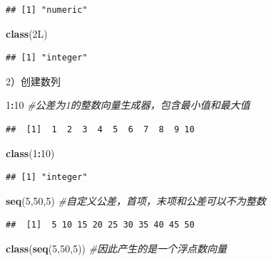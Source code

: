 \documentclass[]{book}
\newenvironment{Shaded}{\begin{snugshade}}{\end{snugshade}}
\newcommand{\CommentTok}[1]{\textcolor[rgb]{0.56,0.35,0.01}{\textit{#1}}}
\newcommand{\DecValTok}[1]{\textcolor[rgb]{0.00,0.00,0.81}{#1}}
\newcommand{\KeywordTok}[1]{\textcolor[rgb]{0.13,0.29,0.53}{\textbf{#1}}}
\newcommand{\NormalTok}[1]{#1}
\newcommand{\OperatorTok}[1]{\textcolor[rgb]{0.81,0.36,0.00}{\textbf{#1}}}
\begin{document}
\begin{verbatim}
## [1] "numeric"
\end{verbatim}

\begin{Shaded}
\begin{Highlighting}[]
\KeywordTok{class}\NormalTok{(2L)}
\end{Highlighting}
\end{Shaded}

\begin{verbatim}
## [1] "integer"
\end{verbatim}

2）创建数列

\begin{Shaded}
\begin{Highlighting}[]
\DecValTok{1}\OperatorTok{:}\DecValTok{10} \CommentTok{#公差为1的整数向量生成器，包含最小值和最大值}
\end{Highlighting}
\end{Shaded}

\begin{verbatim}
##  [1]  1  2  3  4  5  6  7  8  9 10
\end{verbatim}

\begin{Shaded}
\begin{Highlighting}[]
\KeywordTok{class}\NormalTok{(}\DecValTok{1}\OperatorTok{:}\DecValTok{10}\NormalTok{)}
\end{Highlighting}
\end{Shaded}

\begin{verbatim}
## [1] "integer"
\end{verbatim}

\begin{Shaded}
\begin{Highlighting}[]
\KeywordTok{seq}\NormalTok{(}\DecValTok{5}\NormalTok{,}\DecValTok{50}\NormalTok{,}\DecValTok{5}\NormalTok{) }\CommentTok{#自定义公差，首项，末项和公差可以不为整数}
\end{Highlighting}
\end{Shaded}

\begin{verbatim}
##  [1]  5 10 15 20 25 30 35 40 45 50
\end{verbatim}

\begin{Shaded}
\begin{Highlighting}[]
\KeywordTok{class}\NormalTok{(}\KeywordTok{seq}\NormalTok{(}\DecValTok{5}\NormalTok{,}\DecValTok{50}\NormalTok{,}\DecValTok{5}\NormalTok{)) }\CommentTok{#因此产生的是一个浮点数向量}
\end{Highlighting}
\end{Shaded}
\end{document}
